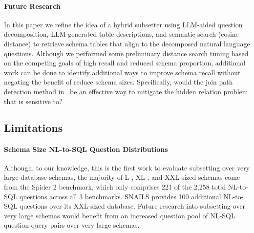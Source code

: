 \paragraph{\textbf{Future Research}}
In this paper we refine the idea of a hybrid subsetter using LLM-aided question decomposition, LLM-generated table descriptions, and semantic search (cosine distance) to retrieve schema tables that align to the decomposed natural language questions.
Although we performed some preliminary distance search tuning based on the competing goals of high recall and reduced schema proportion, additional work can be done to identify additional ways to improve schema recall without negating the benefit of reduce schema sizes. 
Specifically, would the join path detection method in~\cite{Katsogiannis-Meimarakis2026} be an effective way to mitigate the hidden relation problem that \PROJECTNAME{ }is sensitive to?

\subsection{Limitations}

\paragraph{\textbf{Schema Size NL-to-SQL Question Distributions}}
Although, to our knowledge, this is the first work to evaluate subsetting over very large database schemas, the majority of L-, XL-, and XXL-sized schemas come from the Spider 2 benchmark, which only comprises 221 of the 2,258 total NL-to-SQL questions across all 3 benchmarks.
SNAILS provides 100 additional NL-to-SQL questions over its XXL-sized database.
Future research into subsetting over very large schemas would benefit from an increased question pool of NL-SQL question query pairs over very large schemas.


